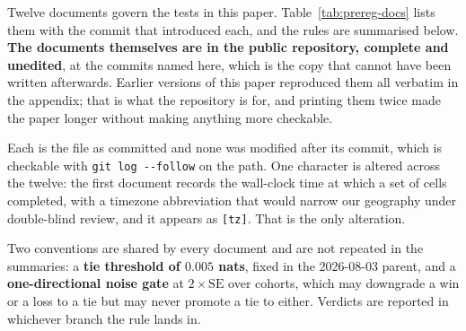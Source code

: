 Twelve documents govern the tests in this paper. Table~\ref{tab:prereg-docs}
lists them with the commit that introduced each, and the rules are
summarised below. \textbf{The documents themselves are in the public
repository, complete and unedited}, at the commits named here, which is the
copy that cannot have been written afterwards. Earlier versions of this paper
reproduced them all verbatim in the appendix; that is what the repository is
for, and printing them twice made the paper longer without making anything
more checkable.

Each is the file as committed and none was modified after its commit, which
is checkable with \texttt{git log -{}-follow} on the path. One character is
altered across the twelve: the first document records the wall-clock time at
which a set of cells completed, with a timezone abbreviation that would
narrow our geography under double-blind review, and it appears as
\texttt{[tz]}. That is the only alteration.

Two conventions are shared by every document and are not repeated in the
summaries: a \textbf{tie threshold of $0.005$ nats}, fixed in the
2026-08-03 parent, and a \textbf{one-directional noise gate} at
$2\times\mathrm{SE}$ over cohorts, which may downgrade a win or a loss to a
tie but may never promote a tie to either. Verdicts are reported in
whichever branch the rule lands in.

